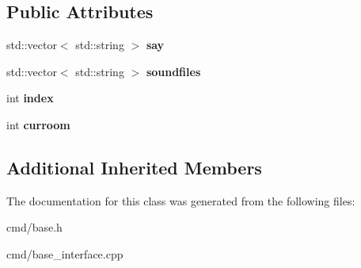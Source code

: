 \subsection*{Public Attributes}
\begin{DoxyCompactItemize}
\item 
std\+::vector$<$ std\+::string $>$ {\bfseries say}\hypertarget{classBaseInterface_1_1Room_1_1Talk_adfa839c8e821c5ac4c25106ef004752c}{}\label{classBaseInterface_1_1Room_1_1Talk_adfa839c8e821c5ac4c25106ef004752c}

\item 
std\+::vector$<$ std\+::string $>$ {\bfseries soundfiles}\hypertarget{classBaseInterface_1_1Room_1_1Talk_aa5591976a72b490e677c7d075319acef}{}\label{classBaseInterface_1_1Room_1_1Talk_aa5591976a72b490e677c7d075319acef}

\item 
int {\bfseries index}\hypertarget{classBaseInterface_1_1Room_1_1Talk_af9e6e8abadd7e71f35a9943f5bd79d29}{}\label{classBaseInterface_1_1Room_1_1Talk_af9e6e8abadd7e71f35a9943f5bd79d29}

\item 
int {\bfseries curroom}\hypertarget{classBaseInterface_1_1Room_1_1Talk_a0e45f336ac35effb8749001addee2557}{}\label{classBaseInterface_1_1Room_1_1Talk_a0e45f336ac35effb8749001addee2557}

\end{DoxyCompactItemize}
\subsection*{Additional Inherited Members}


The documentation for this class was generated from the following files\+:\begin{DoxyCompactItemize}
\item 
cmd/base.\+h\item 
cmd/base\+\_\+interface.\+cpp\end{DoxyCompactItemize}
